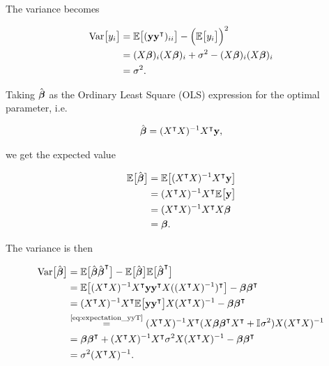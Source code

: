 The variance becomes

\begin{align*}
    \variance{y_i} &= \EE{(\vec{y}\vec{y}\TT)_{ii}} -\Big(\EE{y_i}\Big)^2\\
    &= \Xbi \Xbi + \sigma^2 - \Xbi \Xbi\\
    &= \sigma^2.
\end{align*}


Taking $\optbeta$ as the Ordinary Least Square (OLS) expression for the optimal parameter, i.e.

\begin{align*}
    \optbeta = \invhessian X\TT \vec{y},
\end{align*}

we get the expected value

\begin{align*}
    \EE{\optbeta} &= \EE{\invhessian X\TT \vec{y}} \\
    &= \invhessian X\TT \EE{\vec{y}} \\
    &= \invhessian \hessian \svec{\beta} \\
    &= \svec{\beta}.
\end{align*}

The variance is then 

\begin{align*}
    \variance{\optbeta} &= \EE{\optbeta \optbeta\TT} -\EE{\optbeta} \EE{\optbeta\TT} \\
    &= \EE{\invhessian X\TT  \vec{y} \vec{y}\TT X (\invhessian)\TT} - \svec{\beta} \svec{\beta}\TT \\
    &= \invhessian X\TT \EE{ \vec{y} \vec{y}\TT } X \invhessian - \svec{\beta} \svec{\beta}\TT \\
    &\stackrel{\text{\eqref{eq:expectation_yyT}}}{=}\invhessian X\TT ( X\svec{\beta} \svec{\beta}\TT X\TT+ \II\sigma^2) X \invhessian \\
    &= \svec{\beta} \svec{\beta} \TT + \invhessian X\TT \sigma^2 X \invhessian - \svec{\beta} \svec{\beta} \TT \\
    &= \sigma^2 \invhessian.
\end{align*}



